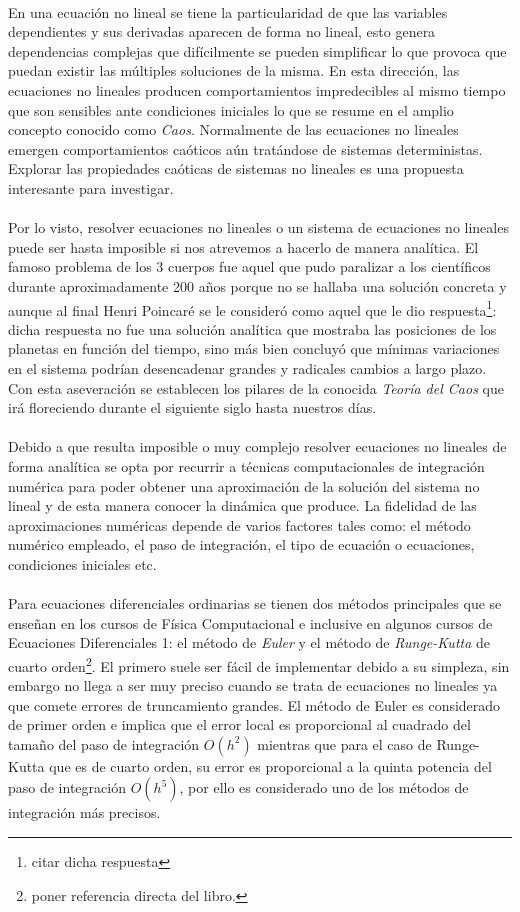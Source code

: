 \\
En una ecuación no lineal se tiene la particularidad de que las variables dependientes y sus derivadas aparecen de forma no lineal, esto genera dependencias complejas que difícilmente se pueden simplificar lo que provoca que puedan existir las múltiples soluciones de la misma. En esta dirección, las ecuaciones no lineales producen comportamientos impredecibles al mismo tiempo que son sensibles ante condiciones iniciales lo que se resume en el amplio concepto conocido como \textit{Caos}. Normalmente de las ecuaciones no lineales emergen comportamientos caóticos aún tratándose de sistemas deterministas. Explorar las propiedades caóticas de sistemas no lineales es una propuesta interesante para investigar.\\
\\
Por lo visto, resolver ecuaciones no lineales o un sistema de ecuaciones no lineales puede ser hasta imposible si nos atrevemos a hacerlo de manera analítica. El famoso problema de los 3 cuerpos fue aquel que pudo paralizar a los científicos durante aproximadamente 200 años porque no se hallaba una solución concreta y aunque al final Henri Poincaré se le consideró como aquel que le dio respuesta\footnote{citar dicha respuesta}: dicha respuesta no fue una solución analítica que mostraba las posiciones de los planetas en función del tiempo, sino más bien concluyó que mínimas variaciones en el sistema podrían desencadenar grandes y radicales cambios a largo plazo. Con esta aseveración se establecen los pilares de la conocida \textit{Teoría del Caos} que irá floreciendo durante el siguiente siglo hasta nuestros días.\\
\\
Debido a que resulta imposible o muy complejo resolver ecuaciones no lineales de forma analítica se opta por recurrir a técnicas computacionales de integración numérica para poder obtener una aproximación de la solución del sistema no lineal y de esta manera conocer la dinámica que produce. La fidelidad de las aproximaciones numéricas depende de varios factores tales como: el método numérico empleado, el paso de integración, el tipo de ecuación o ecuaciones, condiciones iniciales etc. \\
\\
Para ecuaciones diferenciales ordinarias se tienen dos métodos principales que se enseñan en los cursos de Física Computacional e inclusive en algunos cursos de Ecuaciones Diferenciales 1: el método de \textit{Euler} y el método de \textit{Runge-Kutta} de cuarto orden\footnote{poner referencia directa del libro.}. El primero suele ser fácil de implementar debido a su simpleza, sin embargo no llega a ser muy preciso cuando se trata de ecuaciones no lineales ya que comete errores de truncamiento grandes. El método de Euler es considerado de primer orden e implica que el error local es proporcional al cuadrado del tamaño del paso de integración $O(h^2)$ mientras que para el caso de Runge-Kutta que es de cuarto orden, su error es proporcional a la quinta potencia del paso de integración $O(h^5)$, por ello es considerado uno de los métodos de integración más precisos.\\
